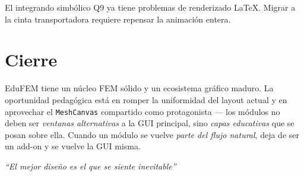 \documentclass[11pt,a4paper]{article}
\begin{document}
El integrando simbólico Q9 ya tiene problemas de renderizado LaTeX.
Migrar a la cinta transportadora requiere repensar la animación entera.

\section*{Cierre}

EduFEM tiene un núcleo FEM sólido y un ecosistema gráfico maduro. La
oportunidad pedagógica está en romper la uniformidad del layout actual
y en aprovechar el \texttt{MeshCanvas} compartido como protagonista —
los módulos no deben ser \emph{ventanas alternativas} a la GUI principal,
sino \emph{capas educativas} que se posan sobre ella. Cuando un módulo
se vuelve \emph{parte del flujo natural}, deja de ser un add-on y se
vuelve la GUI misma.

\vspace{1cm}
\begin{center}
\textit{``El mejor diseño es el que se siente inevitable''}
\end{center}
\end{document}
